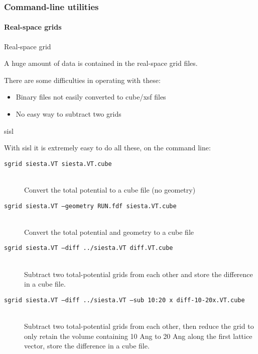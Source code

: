 \begin{frame}[fragile]
  \frametitle{Command-line utilities}
  \framesubtitle{Real-space grids}

  \begin{block}{Real-space grid}

    A huge amount of data is contained in the real-space grid files.

    There are some difficulties in operating with these:
    \begin{itemize}
      \item Binary files not easily converted to cube/xsf files
      \item No easy way to subtract two grids
    \end{itemize}
    
  \end{block}

  \begin{block}{sisl}

    With sisl it is extremely easy to do all these, on the command line:

    \begin{description}
      \item[\texttt{sgrid siesta.VT siesta.VT.cube}]\mbox{}\\

      Convert the total potential to a cube file (no geometry)

      \item[\texttt{sgrid siesta.VT --geometry RUN.fdf siesta.VT.cube}]\mbox{}\\
            
      Convert the total potential and geometry to a cube file

      \item[\texttt{sgrid siesta.VT --diff ../siesta.VT diff.VT.cube}]\mbox{}\\

      Subtract two total-potential grids from each other and store the difference in a
      cube file.

      \item[\texttt{sgrid siesta.VT --diff ../siesta.VT --sub 10:20 x diff-10-20x.VT.cube}]\mbox{}\\

      Subtract two total-potential grids from each other, then reduce the grid to only
      retain the volume containing 10 Ang to 20 Ang along the first lattice vector, store the difference in a
      cube file.

    \end{description}
    
  \end{block}
  
\end{frame}



